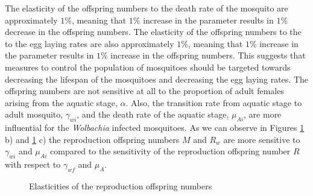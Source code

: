 \documentclass{ws-rv9x6}
\begin{document}
    The elasticity of the offspring numbers to the death rate of the mosquito are approximately $1\%$, meaning that $1\%$ increase in the parameter results in $1\%$ decrease in the offspring numbers. The elasticity of the offspring numbers to the  to the egg laying rates are also approximately $1\%$, meaning that $1\%$ increase in the parameter results in $1\%$ increase in the offspring numbers.  
    This suggests that measures to control the population of mosquitoes should be targeted towards decreasing the lifespan of the mosquitoes and decreasing the egg laying rates. The offspring numbers are not sensitive at all to the proportion of adult females arising from the aquatic stage, $\alpha$. Also, the transition rate from aquatic stage to adult mosquito, $\gamma_{wi}$, and the death rate of the aquatic stage, $\mu_{Ai}$, are more influential for the \textit{Wolbachia} infected mosquitoes. As we can observe in Figures \ref{elast2} b) and \ref{elast2} c) the reproduction offspring numbers $M$ and $R_w$ are more sensitive to $\gamma_{wi}$ and $\mu_{Ai}$ compared to the sensitivity of the reproduction offspring number $R$ with respect to $\gamma_{wf}$ and $\mu_{A}$.

 \begin{figure}[H]%
    \centering
    \qquad
    \qquad
    \qquad
    \caption{Elasticities of the reproduction offspring numbers}
    \label{elast2}
\end{figure} 
\end{document}

